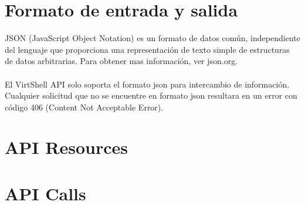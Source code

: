 \section{Formato de entrada y salida}
JSON (JavaScript Object Notation) es un formato de datos común, independiente del lenguaje que proporciona una representación de texto simple de estructuras de datos arbitrarias. Para obtener mas información, ver json.org.\\
\\
El VirtShell API solo soporta el formato json para intercambio de información. Cualquier solicitud que no se encuentre en formato json resultara en un error con código 406 (Content Not Acceptable Error).



\section{API Resources}












\section{API Calls}


